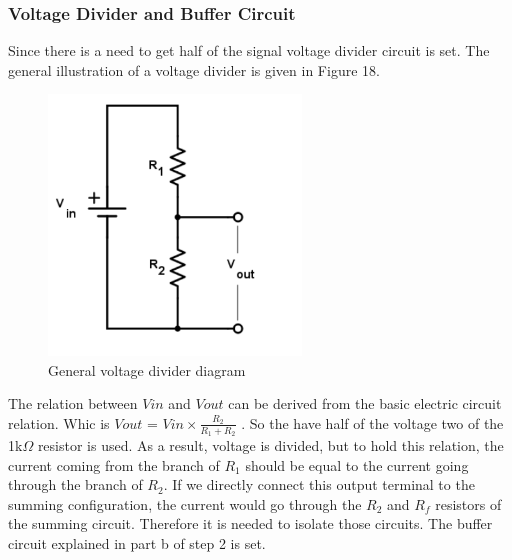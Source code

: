 \documentclass[letterpaper,12pt]{article}
\begin{document}
\subsubsection{Voltage Divider and Buffer Circuit}
Since there is a need to get half of the signal voltage divider circuit is set. The general illustration of a voltage divider is given in Figure 18.
\begin{figure}[H]
	\centering
   \includegraphics[width=0.6\textwidth]{voltage_divider.png}
   \caption{General voltage divider diagram}
\end{figure} 
The relation between \(V{in}\) and \(V{out}\) can be derived from the basic electric circuit relation. Whic is \(V{out}\) = \(V{in} \times \frac{R_2}{R_1+R_2}\) . So the have half of the voltage two of the 1k\(\Omega\) resistor is used.
As a result, voltage is divided, but to hold this relation, the current coming from the branch of \(R_1\) should be equal to the current going through the branch of \(R_2\). If we directly connect this output terminal to the summing configuration, the current would go through the \(R_2\) and \(R_f\) resistors of the summing circuit. Therefore it is needed to isolate those circuits. The buffer circuit explained in part b of step 2  is set. 
\end{document}
